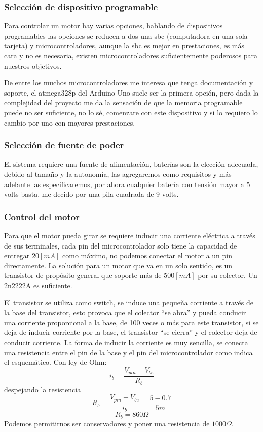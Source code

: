 \subsubsection{Selección de dispositivo  programable}
Para controlar un motor hay varias opciones, hablando de dispositivos
programables las opciones se reducen a dos una sbc (computadora
en una sola tarjeta) y microcontroladores, aunque la sbc es mejor en 
prestaciones, es más cara y no es necesaria, existen 
microcontroladores suficientemente poderosos para nuestros objetivos.

De entre los muchos microcontroladores me interesa que tenga documentación 
y soporte, el atmega328p\cite{atmega328p}
del Arduino Uno suele ser la primera opción, pero dada
la complejidad del proyecto me da la sensación de que la memoria programable
puede no ser suficiente, no lo sé, comenzare con este dispositivo y si lo
requiero lo cambio por uno con mayores prestaciones.
\subsubsection{Selección de fuente de poder}
El sistema requiere una fuente de alimentación, baterías son la elección 
adecuada, debido al tamaño y la autonomía, las agregaremos como requisitos y 
más adelante las especificaremos, por ahora cualquier batería con tensión mayor 
a 5 volts basta, me decido por una pila cuadrada de 9 volts.
\subsubsection{Control del motor}
Para que el motor pueda girar se requiere inducir una corriente eléctrica a
través de sus terminales, cada pin del microcontrolador solo tiene la capacidad
de entregar $20[mA]$ como máximo, no podemos conectar el motor a un pin directamente.
La solución para un motor que va en un solo sentido, es un transistor de
propósito general 
que soporte más de $500[mA]$ por su colector. Un 2n2222A\cite{2n2222a} es
suficiente.

El transistor se utiliza como switch, se induce una pequeña corriente a través de la
base del transistor, esto provoca que el colector ``se abra'' y pueda conducir una
corriente proporcional a la base, de 100 veces o más para este transistor, si se
deja de inducir corriente por la base, el transistor ``se cierra'' y el colector
deja de conducir corriente. La forma de inducir la corriente es muy sencilla, 
se conecta una resistencia 
entre el pin de la base y el pin del microcontrolador como indica el esquemático.
Con ley de Ohm:
\begin{displaymath}
	i_b = \frac{V_{pin} -V_{be}}{R_{b}}
\end{displaymath}
despejando la resistencia 
\begin{displaymath}
	R_b = \frac{V_{pin} -V_{be}}{i_{b}} = \frac{5 - 0.7}{5m}
\end{displaymath}
\begin{displaymath}
	R_b = 860 \Omega
\end{displaymath}
Podemos permitirnos ser conservadores y poner una resistencia de $1000 \Omega$.
